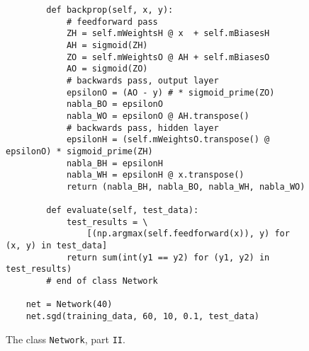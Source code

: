 \begin{figure}[!ht]
\centering
\begin{verbatim}
        def backprop(self, x, y):
            # feedforward pass
            ZH = self.mWeightsH @ x  + self.mBiasesH
            AH = sigmoid(ZH)
            ZO = self.mWeightsO @ AH + self.mBiasesO
            AO = sigmoid(ZO)
            # backwards pass, output layer
            epsilonO = (AO - y) # * sigmoid_prime(ZO)
            nabla_BO = epsilonO
            nabla_WO = epsilonO @ AH.transpose()
            # backwards pass, hidden layer
            epsilonH = (self.mWeightsO.transpose() @ epsilonO) * sigmoid_prime(ZH)
            nabla_BH = epsilonH
            nabla_WH = epsilonH @ x.transpose()
            return (nabla_BH, nabla_BO, nabla_WH, nabla_WO)
        
        def evaluate(self, test_data):
            test_results = \
                [(np.argmax(self.feedforward(x)), y) for (x, y) in test_data]
            return sum(int(y1 == y2) for (y1, y2) in test_results)
        # end of class Network
            
    net = Network(40)
    net.sgd(training_data, 60, 10, 0.1, test_data)   
\end{verbatim}
\vspace*{-0.3cm}
\caption{The class \texttt{Network}, part \texttt{II}.}
\label{fig:Digit-Regocnition.ipynb-4}
\end{figure}


